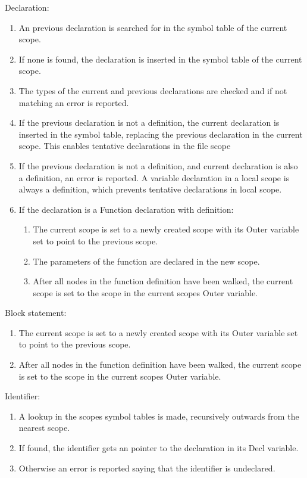 Declaration:
\begin{enumerate}
\item An previous declaration is searched for in the symbol table of the current scope.

\item If none is found, the declaration is inserted in the symbol table of the current scope.

\item The types of the current and previous declarations are checked and if not matching an error is reported.

\item If the previous declaration is not a definition, the current declaration is inserted in the symbol table, replacing the previous declaration in the current scope. This enables tentative declarations in the file scope

\item If the previous declaration is not a definition, and current declaration is also a definition, an error is reported. A variable declaration in a local scope is always a definition, which prevents tentative declarations in local scope.

\item If the declaration is a Function declaration with definition:

\begin{enumerate}[1.]
 \item The current scope is set to a newly created scope with its Outer variable set to point to the previous scope.

 \item The parameters of the function are declared in the new scope.

 \item After all nodes in the function definition have been walked, the current scope is set to the scope in the current scopes Outer variable.
\end{enumerate}
\end{enumerate}

Block statement:
\begin{enumerate}
\item The current scope is set to a newly created scope with its Outer variable set to point to the previous scope.

\item After all nodes in the function definition have been walked, the current scope is set to the scope in the current scopes Outer variable.
\end{enumerate}

Identifier:
\begin{enumerate}
\item A lookup in the scopes symbol tables is made, recursively outwards from the nearest scope.

\item If found, the identifier gets an pointer to the declaration in its Decl variable.

\item Otherwise an error is reported saying that the identifier is undeclared.
\end{enumerate}

